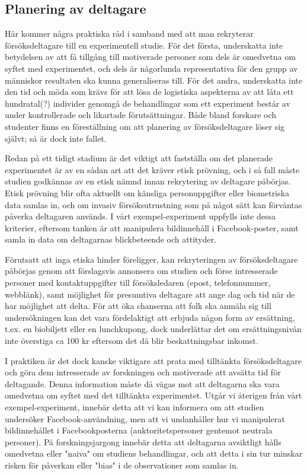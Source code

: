 \documentclass[
]{book}
\begin{document}
\hypertarget{sub07.2.5}{%
\subsection{Planering av deltagare}\label{sub07.2.5}}

Här kommer några praktiska råd i samband med att man rekryterar försöksdeltagare till en experimentell studie. För det första, underskatta inte betydelsen av att få tillgång till motiverade personer som dels är omedvetna om syftet med experimentet, och dels är någorlunda representativa för den grupp av människor resultaten ska kunna generaliseras till. För det andra, underskatta inte den tid och möda som krävs för att lösa de logistiska aspekterna av att låta ett hundratal(?) individer genomgå de behandlingar som ett experiment består av under kontrollerade och likartade förutsättningar. Både bland forskare och studenter finns en föreställning om att planering av försöksdeltagare löser sig självt; så är dock inte fallet.

Redan på ett tidigt stadium är det viktigt att fastställa om det planerade experimentet är av en sådan art att det kräver etisk prövning, och i så fall måste studien godkännas av en etisk nämnd innan rekrytering av deltagare påbörjas. Etisk prövning blir ofta aktuellt om känsliga personuppgifter eller biometriska data samlas in, och om invasiv försöksutrustning som på något sätt kan förväntas påverka deltagaren används. I vårt exempel-experiment uppfylls inte dessa kriterier, eftersom tanken är att manipulera bildinnehåll i Facebook-poster, samt samla in data om deltagarnas blickbeteende och attityder.

Förutsatt att inga etiska hinder föreligger, kan rekryteringen av försöksdeltagare påbörjas genom att förslagsvis annonsera om studien och förse intresserade personer med kontaktuppgifter till försöksledaren (epost, telefonnummer, webblänk), samt möjlighet för presumtiva deltagare att ange dag och tid när de har möjlighet att delta. För att öka chanserna att folk ska anmäla sig till undersökningen kan det vara fördelaktigt att erbjuda någon form av ersättning, t.ex. en biobiljett eller en lunchkupong, dock underlättar det om ersättningsnivån inte överstiga ca 100 kr eftersom det då blir beskattningsbar inkomst.

I praktiken är det dock kanske viktigare att prata med tilltänkta försöksdeltagare och göra dem intresserade av forskningen och motiverade att avsätta tid för deltagande. Denna information måste då vägas mot att deltagarna ska vara omedvetna om syftet med det tilltänkta experimentet. Utgår vi återigen från vårt exempel-experiment, innebär detta att vi kan informera om att studien undersöker Facebook-användning, men att vi undanhåller hur vi manipulerat bildinnehållet i Facebookposterna (auktoritetspersoner gentemot neutrala personer). På forskningsjargong innebär detta att deltagarna avsiktligt hålls omedvetna eller "naiva" om studiens behandlingar, och att detta i sin tur minskar risken för påverkan eller "bias" i de observationer som samlas in.
\end{document}
